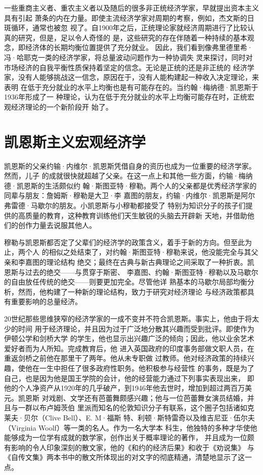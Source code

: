 一些重商主义者、重农主义者以及随后的很多非正统经济学家，早就提出资本主义具有引起
萧条的内在力量。即使主流经济学家对周期的考察，例如，杰文斯的日斑循环，通常也被忽
视了。自1900年之后，正统理论家就经济周期进行了比较认真的研究，但是，足以令人奇怪的
是，这些研究的存在伴随着一种持续的基本观念，即经济体的长期均衡位置提供了充分就业。
因此，我们看到像弗里德里希·冯·哈耶克一类的经济学家，将总量波动问题作为一种协调失
灵来探讨，同时对市场经济的自我平衡性质保持着坚定的信念。无论是正统的还是非正统的
经济学家，没有人能够挑战这一信念，原因在于，没有人能构建起一种收入决定理论，来表明
在低于充分就业的水平上均衡也是有可能存在的。当约翰·梅纳德·凯恩斯于1936年形成了一
种理论，认为在低于充分就业的水平上均衡可能存在时，正统宏观经济理论的一个新阶段开
始了。

\section{凯恩斯主义宏观经济学}

凯恩斯的父亲约输·内维尔·凯恩斯凭借自身的资历也成为一位重要的经济学家。然而，儿子
的成就很快就超越了父亲。在这一点上和其他一些方面，约输·梅纳德·凯恩斯的生活颇似约
翰·斯图亚特·穆勒。两个人的父亲都是优秀经济学家的同辈与朋友：詹姆斯·穆勒是大卫·李
嘉图的朋友，约输·内维尔·凯恩斯是阿尔弗雷德·马歇尔的朋友。小凯恩斯与小穆勒都接受了
特别为知识分子的孩子们提供的高质量的教育，这种教育训练他们天生敏锐的头脑去开辟新
天地，并借助他们的创作力量去说服其他人。

穆勒与凯恩斯都否定了父辈们的经济学的政策含义，着手于新的方向。但至此为止，两个人
的相似之处结束了，对约翰·斯图亚特·穆勒来说，他没能完全与其父亲和李嘉图的理论结构
绝交；最终在古典与新古典理论之间采取了一种折衷。凯恩斯与过去的绝交——与贯穿于斯密、
李嘉图、约翰·斯图亚特·穆勒以及马歇尔的自由放任传统的绝交——则要更加完全。尽管他详
熟基本的马歇尔局部均衡分析，然而，他构建了一种新的理论结构，致力于研究对经济理论
与经济政策都具有重要影响的总量经济。

20世纪那些思维狭窄的经济学家的一成不变并不符合凯恩斯。事实上，他由于将太少的时间
用于经济理论，并且因为过于广泛地分散其兴趣而受到批评。即使作为伊顿公学和剑桥大学
的学生，他也显示出兴趣广泛的倾向；因此，他以业余艺术爱好者而为人所知。完成教育后，他
进入英国政府的印度事务部做文职人员，在重返剑桥之前他在那里干了两年。他从未专职做
过教师。他对经济政策的持续兴趣，使他在一生中担任了很多政府性职务。他积极参与经营性
的事务，既是为了自己，也是因为他是国王学院的会计，他的经营能力通过下列事实表现出来，
即他的个人净资产从1920年的几乎破产，到1946年他去世时，增加到超过两百万美元。凯恩斯
对戏剧、文学还有芭蕾舞颇感兴趣；他与一位芭蕾舞女演员结婚，并且与一群以布卢姆茨伯
里派而知名的伦敦知识分子有联系，这个圈子包括诸如克莱夫·贝尔（Clive Bell）、E. M·福斯
特、利顿·斯特雷奇以及维吉尼亚·伍尔夫（Virginia Woolf）等一类的名人。作为一名大学本
科生，他独特的多种才华使他能够成为一位学有成就的数学家，创作出关于概率理论的著作，
并且成为一位颇有影响的令人印象深刻的散文家，他的《和约的经济后果》和收于《劝说集》
与《自传文集》两本书中的散文所体现出的对文字的彻底精通，清楚地显示了这一点。

